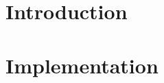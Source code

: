 \documentclass{article}
\begin{document}
\maketitle


\section{Introduction}

\section{Implementation}
\end{document}
